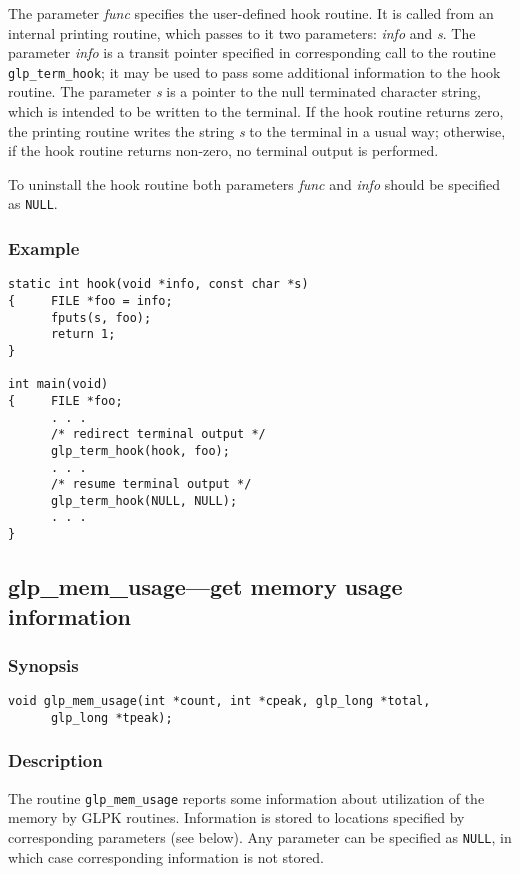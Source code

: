 The parameter {\it func} specifies the user-defined hook routine. It is
called from an internal printing routine, which passes to it two
parameters: {\it info} and {\it s}. The parameter {\it info} is a
transit pointer specified in corresponding call to the routine
\verb|glp_term_hook|; it may be used to pass some additional information
to the hook routine. The parameter {\it s} is a pointer to the null
terminated character string, which is intended to be written to the
terminal. If the hook routine returns zero, the printing routine writes
the string {\it s} to the terminal in a usual way; otherwise, if the
hook routine returns non-zero, no terminal output is performed.

To uninstall the hook routine both parameters {\it func} and {\it info}
should be specified as \verb|NULL|.

\subsubsection*{Example}

\begin{verbatim}
static int hook(void *info, const char *s)
{     FILE *foo = info;
      fputs(s, foo);
      return 1;
}

int main(void)
{     FILE *foo;
      . . .
      /* redirect terminal output */
      glp_term_hook(hook, foo);
      . . .
      /* resume terminal output */
      glp_term_hook(NULL, NULL);
      . . .
}
\end{verbatim}

\subsection{glp\_mem\_usage---get memory usage information}

\subsubsection*{Synopsis}

\begin{verbatim}
void glp_mem_usage(int *count, int *cpeak, glp_long *total,
      glp_long *tpeak);
\end{verbatim}

\subsubsection*{Description}

The routine \verb|glp_mem_usage| reports some information about
utilization of the memory by GLPK routines. Information is stored to
locations specified by corresponding parameters (see below). Any
parameter can be specified as \verb|NULL|, in which case corresponding
information is not stored.

